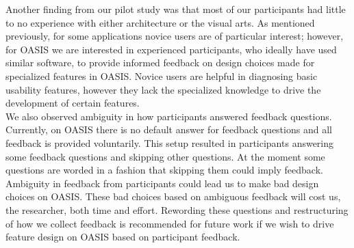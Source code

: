 Another finding from our pilot study was that most of our participants had little to no experience with either architecture or the visual arts.	As mentioned previously, for some applications novice users are of particular interest; however, for OASIS we are interested in experienced participants, who  ideally have used similar software, to provide informed feedback on design choices made for specialized features in OASIS.  Novice users are helpful in diagnosing basic usability features, however they lack the specialized knowledge to drive the development of certain features.\\ 

We also observed ambiguity in how participants answered feedback questions.  Currently, on OASIS there is no default answer for feedback questions and all feedback is provided voluntarily.  This setup resulted in participants answering some feedback questions and skipping other questions.  At the moment some questions are worded in a fashion that skipping them could imply feedback.  Ambiguity in feedback from participants could lead us to make bad design choices on OASIS.  These bad choices based on ambiguous feedback will cost us, the researcher, both time and effort.  Rewording these questions and restructuring of how we collect feedback is recommended for future work if we wish to drive feature design on OASIS based on participant feedback.\\ 
    
